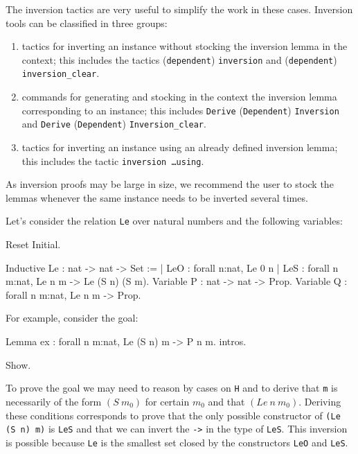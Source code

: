 \begin{coq_example*}
The inversion tactics are very useful to simplify the work in these
cases. Inversion tools can be classified in three groups:

\begin{enumerate}
\item tactics for inverting an instance without stocking the inversion
  lemma in the context; this includes the tactics
  (\texttt{dependent})  \texttt{inversion} and
 (\texttt{dependent}) \texttt{inversion\_clear}.
\item commands for generating and stocking in the context the inversion
  lemma corresponding to an instance; this includes \texttt{Derive}
  (\texttt{Dependent}) \texttt{Inversion} and \texttt{Derive}
  (\texttt{Dependent}) \texttt{Inversion\_clear}.
\item tactics for inverting an instance using an already defined
  inversion lemma; this includes the tactic \texttt{inversion \ldots using}.
\end{enumerate}

As inversion proofs may be large in size, we recommend the user to
stock the lemmas whenever the same instance needs to be inverted
several times.

\firstexample
{}

Let's consider the relation \texttt{Le} over natural numbers and the
following variables:

\begin{coq_eval}
Reset Initial.
\end{coq_eval}

\begin{coq_example*}
Inductive Le : nat -> nat -> Set :=
  | LeO : forall n:nat, Le 0 n
  | LeS : forall n m:nat, Le n m -> Le (S n) (S m).
Variable P : nat -> nat -> Prop.
Variable Q : forall n m:nat, Le n m -> Prop.
\end{coq_example*}

For example, consider the goal:

\begin{coq_eval}
Lemma ex : forall n m:nat, Le (S n) m -> P n m.
intros.
\end{coq_eval}

\begin{coq_example}
Show.
\end{coq_example}

To prove the goal we may need to reason by cases on \texttt{H} and to 
 derive that \texttt{m}  is necessarily of
the form $(S~m_0)$ for certain $m_0$ and that $(Le~n~m_0)$.  
Deriving these conditions corresponds to prove that the
only possible constructor of \texttt{(Le (S n) m)}  is
\texttt{LeS} and that we can invert the 
\texttt{->} in the type  of \texttt{LeS}.  
This inversion is possible because \texttt{Le} is the smallest set closed by
the constructors \texttt{LeO} and \texttt{LeS}.


\end{coq_example*}
